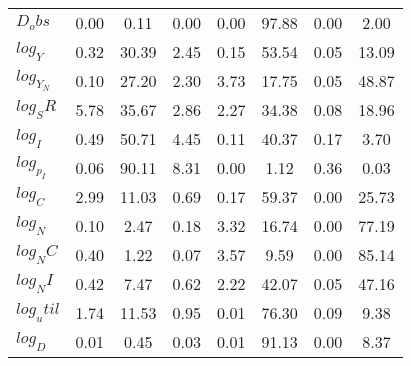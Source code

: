 \begin{center}
\begin{longtable}{lccccccc}
$D_obs     $	 & 	        0.00	 & 	        0.11	 & 	        0.00	 & 	        0.00	 & 	       97.88	 & 	        0.00	 & 	        2.00 \\ 
$log_Y     $	 & 	        0.32	 & 	       30.39	 & 	        2.45	 & 	        0.15	 & 	       53.54	 & 	        0.05	 & 	       13.09 \\ 
$log_Y_N   $	 & 	        0.10	 & 	       27.20	 & 	        2.30	 & 	        3.73	 & 	       17.75	 & 	        0.05	 & 	       48.87 \\ 
$log_SR    $	 & 	        5.78	 & 	       35.67	 & 	        2.86	 & 	        2.27	 & 	       34.38	 & 	        0.08	 & 	       18.96 \\ 
$log_I     $	 & 	        0.49	 & 	       50.71	 & 	        4.45	 & 	        0.11	 & 	       40.37	 & 	        0.17	 & 	        3.70 \\ 
$log_p_I   $	 & 	        0.06	 & 	       90.11	 & 	        8.31	 & 	        0.00	 & 	        1.12	 & 	        0.36	 & 	        0.03 \\ 
$log_C     $	 & 	        2.99	 & 	       11.03	 & 	        0.69	 & 	        0.17	 & 	       59.37	 & 	        0.00	 & 	       25.73 \\ 
$log_N     $	 & 	        0.10	 & 	        2.47	 & 	        0.18	 & 	        3.32	 & 	       16.74	 & 	        0.00	 & 	       77.19 \\ 
$log_NC    $	 & 	        0.40	 & 	        1.22	 & 	        0.07	 & 	        3.57	 & 	        9.59	 & 	        0.00	 & 	       85.14 \\ 
$log_NI    $	 & 	        0.42	 & 	        7.47	 & 	        0.62	 & 	        2.22	 & 	       42.07	 & 	        0.05	 & 	       47.16 \\ 
$log_util  $	 & 	        1.74	 & 	       11.53	 & 	        0.95	 & 	        0.01	 & 	       76.30	 & 	        0.09	 & 	        9.38 \\ 
$log_D     $	 & 	        0.01	 & 	        0.45	 & 	        0.03	 & 	        0.01	 & 	       91.13	 & 	        0.00	 & 	        8.37 \\ 
\end{longtable}
 \end{center}

